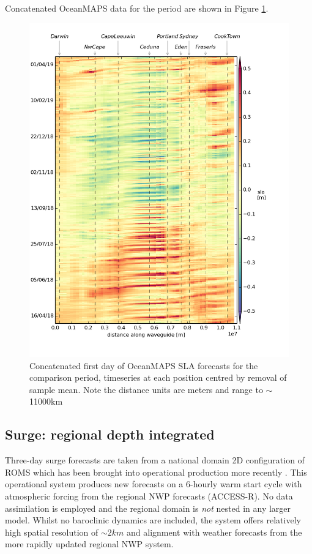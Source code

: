 Concatenated OceanMAPS data for the period are shown in Figure \ref{fig:hov_eg}. 
\begin{figure}[H]\centering
    \noindent\includegraphics[width=\figwidthFull]{figures/plots/concat_sla_day0_full.png}
    \caption[Concatenated first day of OceanMAPS SLA forecasts] 
            {Concatenated first day of OceanMAPS SLA forecasts for the comparison period, 
             timeseries at each position centred by removal of sample mean. Note the distance units are meters and range to $\sim$11000km}
    \label{fig:hov_eg}
\end{figure} 

\subsection{Surge: regional depth integrated  }
\label{sec:roms}
Three-day surge forecasts are taken from a national domain 2D configuration of ROMS \citep{Shchepetkin:2005eh} which has been brought into operational production more recently \citep{Allen:2018aa}.  
This operational system produces new forecasts on a 6-hourly warm start cycle with atmospheric forcing from the regional NWP forecasts (ACCESS-R).
No data assimilation is employed and the regional domain is \emph{not} nested in any larger model.
Whilst no baroclinic dynamics are included, the system offers relatively high spatial resolution of $\sim2km$ and alignment with weather forecasts from the more rapidly updated regional NWP system.


